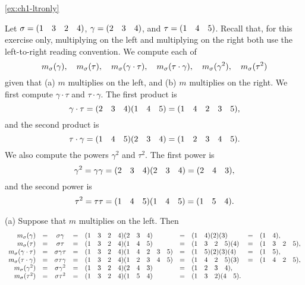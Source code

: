 \begin{solution}{\ref{ex:ch1-ltronly}}{
    Let \(\sigma = (1 \quad 3 \quad 2 \quad 4)\), \(\gamma = (2 \quad 3 \quad 4)\), and \(\tau = (1 \quad 4 \quad 5)\). Recall that, for this exercise only, multiplying on the left and multiplying on the right both use the left-to-right reading convention. We compute each of
    \[
    m_{\sigma}(\gamma),\quad m_{\sigma}(\tau),\quad m_{\sigma}(\gamma\cdot\tau),\quad m_{\sigma}(\tau\cdot\gamma),\quad m_{\sigma}(\gamma^{2}),\quad m_{\sigma}(\tau^{2})
    \]
    given that (a) \(m\) multiplies on the left, and (b) \(m\) multiplies on the right. We first compute \(\gamma\cdot\tau\) and \(\tau\cdot\gamma\). The first product is
    \[
    \gamma\cdot\tau = (2 \quad 3 \quad 4)(1 \quad 4 \quad 5) = (1 \quad 4 \quad 2 \quad 3 \quad 5),
    \]
    and the second product is
    \[
    \tau\cdot\gamma = (1 \quad 4 \quad 5)(2 \quad 3 \quad 4) = (1 \quad 2 \quad 3 \quad 4 \quad 5).
    \]
    We also compute the powers \(\gamma^{2}\) and \(\tau^{2}\). The first power is
    \[
    \gamma^{2} = \gamma\gamma = (2 \quad 3 \quad 4)(2 \quad 3 \quad 4) = (2 \quad 4 \quad 3),
    \]
    and the second power is
    \[
    \tau^{2} = \tau\tau = (1 \quad 4 \quad 5)(1 \quad 4 \quad 5) = (1 \quad 5 \quad 4).
    \]

    (a) Suppose that \(m\) multiplies on the left. Then
    \[
    \begin{array}{rccclclcl}
        m_{\sigma}(\gamma)          & = & \sigma\gamma     & = & (1 \quad 3 \quad 2 \quad 4)(2 \quad 3 \quad 4)           & = & (1 \quad 4)(2)(3)        & = & (1 \quad 4),\\
        m_{\sigma}(\tau)            & = & \sigma\tau       & = & (1 \quad 3 \quad 2 \quad 4)(1 \quad 4 \quad 5)           & = & (1 \quad 3 \quad 2 \quad 5)(4) & = & (1 \quad 3 \quad 2 \quad 5),\\
        m_{\sigma}(\gamma\cdot\tau) & = & \sigma\gamma\tau & = & (1 \quad 3 \quad 2 \quad 4)(1 \quad 4 \quad 2 \quad 3 \quad 5) & = & (1 \quad 5)(2)(3)(4)     & = & (1 \quad 5),\\
        m_{\sigma}(\tau\cdot\gamma) & = & \sigma\tau\gamma & = & (1 \quad 3 \quad 2 \quad 4)(1 \quad 2 \quad 3 \quad 4 \quad 5) & = & (1 \quad 4 \quad 2 \quad 5)(3) & = & (1 \quad 4 \quad 2 \quad 5),\\
        m_{\sigma}(\gamma^{2})      & = & \sigma\gamma^{2} & = & (1 \quad 3 \quad 2 \quad 4)(2 \quad 4 \quad 3)           & = & (1 \quad 2 \quad 3 \quad 4),&&\\
        m_{\sigma}(\tau^{2})        & = & \sigma\tau^{2}   & = & (1 \quad 3 \quad 2 \quad 4)(1 \quad 5 \quad 4)           & = & (1 \quad 3 \quad 2)(4 \quad 5).&&
    \end{array}
    \]

}
\end{solution}
